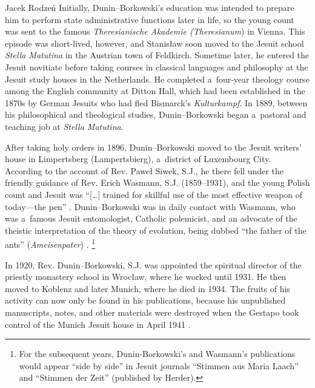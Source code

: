 \begin{artengenv}{Jacek Rodzeń}
Initially, Dunin–Borkowski's education was intended to prepare him to perform state administrative functions later in life, so the young count was sent to the famous \textit{Theresianische Akademie (Theresianum}) in Vienna. This episode was short-lived, however, and Stanisław soon moved to the Jesuit school \textit{Stella Matutina} in the Austrian town of Feldkirch. Sometime later, he entered the Jesuit novitiate before taking courses in classical languages and philosophy at the Jesuit study houses in the Netherlands. He completed a~four-year theology course among the English community at Ditton Hall, which had been established in the 1870s by German Jesuits who had fled Bismarck's \textit{Kulturkampf}. In 1889, between his philosophical and theological studies, Dunin–Borkowski began a~pastoral and teaching job at \textit{Stella Matutina}.

After taking holy orders in 1896, Dunin–Borkowski moved to the Jesuit writers' house in Limpertsberg (Lampertsbierg), a~district of Luxembourg City. According to the account of Rev. Paweł Siwek, S.J., he there fell under the friendly guidance of Rev. Erich Wasmann, S.J. (1859–1931), and the young Polish count and Jesuit was ``[…] trained for skillful use of the most effective weapon of today---the pen''
\parencite[][p.137]{siwek_stanislaw_1935}. %
 Dunin–Borkowski was in daily contact with Wasmann, who was a~famous Jesuit entomologist, Catholic polemicist, and an advocate of the theistic interpretation of the theory of evolution, being dubbed ``the father of the ants'' (\textit{Ameisenpater}) 
\parencites[for more on Wasmann's activity see][]{baranzke_erich_1999}[][]{polak_spor_2007}.%
\footnote{For the subsequent years, Dunin-Borkowski's and Wasmann's publications would appear ``side by side'' in Jesuit journals ``Stimmen aus Maria Laach'' and ``Stimmen der Zeit'' (published by Herder).}

In 1920, Rev. Dunin–Borkowski, S.J. was appointed the spiritual director of the priestly monastery school in Wrocław, where he worked until 1931. He then moved to Koblenz and later Munich, where he died in 1934. The fruits of his activity can now only be found in his publications, because his unpublished manuscripts, notes, and other materials were destroyed when the Gestapo took control of the Munich Jesuit house in April 1941
\parencite[][]{stasiewski_dunin-borkowski_1959}.%



\end{artengenv}
